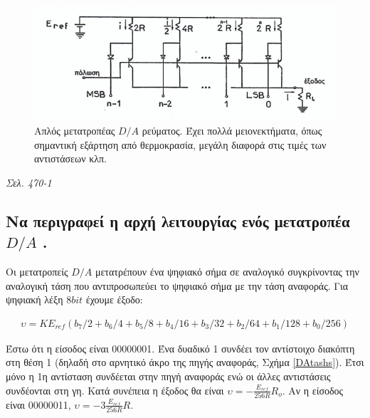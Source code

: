 \documentclass{article}
\begin{document}
\begin{figure}[h!]
    \includegraphics[width=\linewidth]{DArevma.png}
    \caption{Απλός μετατροπέας $D/A$ ρεύματος. Έχει πολλά μειονεκτήματα, όπως σημαντική εξάρτηση από θερμοκρασία, μεγάλη διαφορά στις τιμές των αντιστάσεων κλπ.}
    \label{DArevmatos}
\end{figure}

\emph{Σελ. 470-1}

\subsection{Να περιγραφεί η αρχή λειτουργίας ενός μετατροπέα $D/A$ .}
Οι μετατροπείς $D/A$ μετατρέπουν ένα ψηφιακό σήμα σε αναλογικό συγκρίνοντας την αναλογική τάση που αντιπροσωπεύει το ψηφιακό σήμα με την τάση αναφοράς. Για ψηφιακή λέξη $8bit$ έχουμε
έξοδο: 

\begin{align*}
    \upsilon = K E_{ref} \left( b_7/2 + b_6/4 + b_5/8 + b_4/16 +b_3/32 + b_2/64 + b_1/128 + b_0/256 \right)
\end{align*}

Έστω ότι η είσοδος είναι 00000001. Ένα δυαδικό 1 συνδέει τον αντίστοιχο διακόπτη στη θέση 1 (δηλαδή στο αρνητικό άκρο της πηγής αναφοράς, Σχήμα \ref{DAtashs}). Έτσι
μόνο η 1η αντίσταση συνδέεται στην πηγή αναφοράς ενώ οι άλλες αντιστάσεις συνδέονται στη γη. Κατά συνέπεια η έξοδος θα είναι $\upsilon = -\frac{E_{ref}}{256R}R_o$. Αν η είσοδος είναι
00000011, $\upsilon = -3\frac{E_{ref}}{256R}R$.
\end{document}
